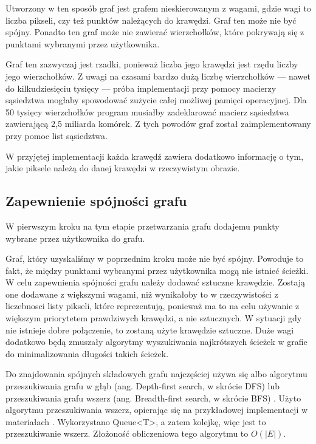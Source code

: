 \documentclass[a4paper,11pt,twoside]{report}
\theoremstyle{definition}
\begin{document}
Utworzony w ten sposób graf jest grafem nieskierowanym z wagami, gdzie wagi to liczba pikseli, czy też punktów należących do krawędzi. Graf ten może nie być spójny. Ponadto ten graf może nie zawierać wierzchołków, które pokrywają się z punktami wybranymi przez użytkownika.

Graf ten zazwyczaj jest rzadki, ponieważ liczba jego krawędzi jest rzędu liczby jego wierzchołków.  Z uwagi na czasami bardzo dużą liczbę wierzchołków --- nawet do kilkudziesięciu tysięcy --- próba implementacji przy pomocy macierzy sąsiedztwa mogłaby spowodować zużycie całej możliwej pamięci operacyjnej. Dla 50 tysięcy wierzchołków program musiałby zadeklarować macierz sąsiedztwa zawierającą 2,5 miliarda komórek. Z tych powodów graf został zaimplementowany przy pomoc list sąsiedztwa.

W przyjętej implementacji każda krawędź zawiera dodatkowo informację o tym, jakie piksele należą do danej krawędzi w rzeczywistym obrazie.

\subsection {Zapewnienie spójności grafu}

W pierwszym kroku na tym etapie przetwarzania grafu dodajemu punkty wybrane przez użytkownika do grafu.

Graf, który uzyskaliśmy w poprzednim kroku może nie być spójny. Powoduje to fakt, że między punktami wybranymi przez użytkownika mogą nie istnieć ścieżki. W celu zapewnienia spójności grafu należy dodawać sztuczne krawędzie. Zostają one dodawane z większymi wagami, niż wynikałoby to w rzeczywistości z liczebnosci listy pikseli, które reprezentują, ponieważ ma to na celu używanie z większym priorytetem prawdziwych krawędzi, a nie sztucznych. W sytuacji gdy nie istnieje dobre połączenie, to zostaną użyte krawędzie sztuczne. Duże wagi dodatkowo będą zmuszały algorytmy wyszukiwania najkrótszych ścieżek w grafie do minimalizowania długości takich ścieżek. 

Do znajdowania spójnych składowych grafu najczęściej używa się albo algorytmu przeszukiwania grafu w głąb (ang. Depth-first search, w skrócie DFS) lub przeszukiwania grafu wszerz (ang. Breadth-first search, w skrócie BFS) \cite{Algorytmy Sedgewick}. Użyto algorytmu przeszukiwania wszerz, opierając się na przykładowej implementacji w materiałach \cite{AiSD2}. Wykorzystano Queue<T>, a zatem kolejkę, więc jest to przeszukiwanie wszerz. Złożoność obliczeniowa tego algorytmu to $O(|E|)$.  
\end{document}
